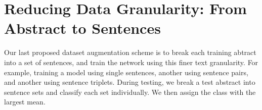 \section{Reducing Data Granularity: From Abstract to Sentences}
Our last proposed dataset augmentation scheme is to break each training abtract into a set of sentences, and train
the network using this finer text granularity. For example, training a model using single sentences, another using sentence pairs,
and another using sentence triplets.
During testing, we break a test abstract into sentence sets and classify each set individually. We then assign
the class with the largest mean.
